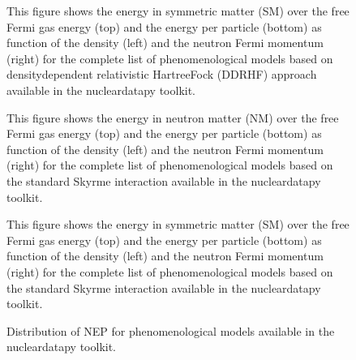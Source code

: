 \documentclass[letterpaper,10pt,english]{sphinxmanual}
\begin{document}
\begin{figure}[htbp]
\centering
\capstart

\noindent{}
\caption{This figure shows the energy in symmetric matter (SM) over the free Fermi gas energy (top) and the energy per particle (bottom) as function of the density (left) and the neutron Fermi momentum (right) for the complete list of phenomenological models based on density\sphinxhyphen{}dependent relativistic Hartree\sphinxhyphen{}Fock (DDRHF) approach available in the nucleardatapy toolkit.}\label{\detokenize{source/api/setup_pheno_matter:id6}}\end{figure}

\begin{figure}[htbp]
\centering
\capstart

\noindent{}
\caption{This figure shows the energy in neutron matter (NM) over the free Fermi gas energy (top) and the energy per particle (bottom) as function of the density (left) and the neutron Fermi momentum (right) for the complete list of phenomenological models based on the standard Skyrme interaction available in the nucleardatapy toolkit.}\label{\detokenize{source/api/setup_pheno_matter:id7}}\end{figure}

\begin{figure}[htbp]
\centering
\capstart

\noindent{}
\caption{This figure shows the energy in symmetric matter (SM) over the free Fermi gas energy (top) and the energy per particle (bottom) as function of the density (left) and the neutron Fermi momentum (right) for the complete list of phenomenological models based on the standard Skyrme interaction available in the nucleardatapy toolkit.}\label{\detokenize{source/api/setup_pheno_matter:id8}}\end{figure}

\begin{figure}[htbp]
\centering
\capstart

\noindent{}
\caption{Distribution of NEP for phenomenological models available in the nucleardatapy toolkit.}\label{\detokenize{source/api/setup_pheno_matter:id9}}\end{figure}

\sphinxstepscope
\end{document}
